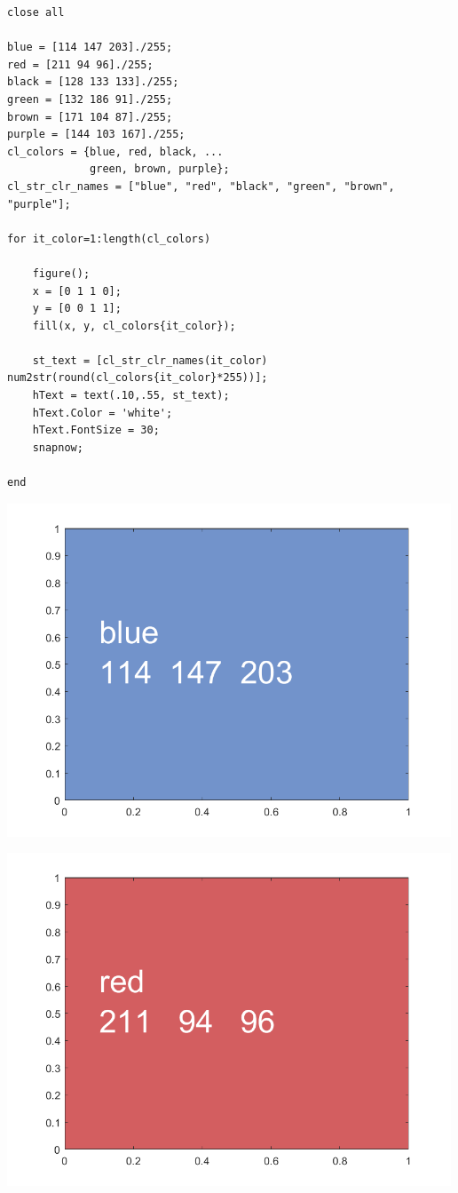 \documentclass[
]{book}
\begin{document}
\begin{verbatim}
close all

blue = [114 147 203]./255;
red = [211 94 96]./255;
black = [128 133 133]./255;
green = [132 186 91]./255;
brown = [171 104 87]./255;
purple = [144 103 167]./255;
cl_colors = {blue, red, black, ...
             green, brown, purple};
cl_str_clr_names = ["blue", "red", "black", "green", "brown", "purple"];

for it_color=1:length(cl_colors)
    
    figure();
    x = [0 1 1 0];
    y = [0 0 1 1];
    fill(x, y, cl_colors{it_color});
    
    st_text = [cl_str_clr_names(it_color) num2str(round(cl_colors{it_color}*255))];
    hText = text(.10,.55, st_text);
    hText.Color = 'white';
    hText.FontSize = 30; 
    snapnow;
    
end
\end{verbatim}

\includegraphics[width=5.20833in,height=\textheight]{img/fs_color_images/figure_6.png}

\includegraphics[width=5.20833in,height=\textheight]{img/fs_color_images/figure_7.png}
\end{document}
